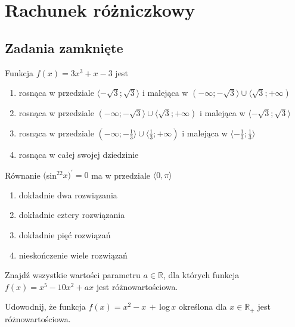 \setcounter{parc}{0}
\addtocounter{chapc}{1}

\chapter{Rachunek różniczkowy}

\section{Zadania zamknięte}

\zadanie Funkcja $f(x) = 3x^3 + x - 3$ jest
\begin{enumerate}[label=\alph*)]
	\item rosnąca w przedziale $ \langle -\sqrt{3}; \sqrt{3} \rangle $ i malejąca w $ ( -\infty; -\sqrt{3} \rangle \cup \langle \sqrt{3}; +\infty ) $
	\item rosnąca w przedziale $ ( -\infty; -\sqrt{3} \rangle \cup \langle \sqrt{3}; +\infty ) $ i malejąca w $ \langle -\sqrt{3}; \sqrt{3} \rangle $
	\item rosnąca w przedziale $ ( -\infty; -\frac{1}{3} \rangle \cup \langle \frac{1}{3}; +\infty ) $ i malejąca w $ \langle -\frac{1}{3}; \frac{1}{3} \rangle $
	\item rosnąca w całej swojej dziedzinie
\end{enumerate}

\zadanie Równanie $($sin$^22x)^{'}=0$ ma w przedziale $\langle 0, \pi \rangle$
\begin{enumerate}[label=\alph*)]
	\item dokładnie dwa rozwiązania
	\item dokładnie cztery rozwiązania
	\item dokładnie pięć rozwiązań %
	\item nieskończenie wiele rozwiązań
\end{enumerate}

\zadanie Znajdź wszystkie wartości parametru $a\in\mathbb{R}$, dla których funkcja $f(x) = x^5 - 10x^2 + ax$ jest różnowartościowa.

\zadanie Udowodnij, że funkcja $f(x) = x^2 - x\,+\,$log$\,x$ określona dla $x \in \mathbb{R}_+$ jest różnowartościowa.
